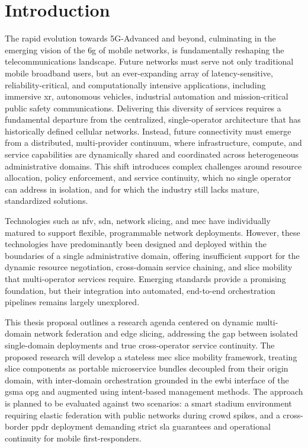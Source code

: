 \chapter{Introduction}
\label{chap:introduction}

\begin{introduction}

\end{introduction}

The rapid evolution towards 5G-Advanced and beyond, culminating in the emerging vision of the \ac{6g} of mobile networks, is fundamentally reshaping the telecommunications landscape. Future networks must serve not only traditional mobile broadband users, but an ever-expanding array of latency-sensitive, reliability-critical, and computationally intensive applications, including immersive \ac{xr}, autonomous vehicles, industrial automation and mission-critical public safety communications. Delivering this diversity of services requires a fundamental departure from the centralized, single-operator architecture that has historically defined cellular networks. Instead, future connectivity must emerge from a distributed, multi-provider continuum, where infrastructure, compute, and service capabilities are dynamically shared and coordinated across heterogeneous administrative domains. This shift introduces complex challenges around resource allocation, policy enforcement, and service continuity, which no single operator can address in isolation, and for which the industry still lacks mature, standardized solutions.

Technologies such as \ac{nfv}, \ac{sdn}, network slicing, and \ac{mec} have individually matured to support flexible, programmable network deployments. However, these technologies have predominantly been designed and deployed within the boundaries of a single administrative domain, offering insufficient support for the dynamic resource negotiation, cross-domain service chaining, and slice mobility that multi-operator services require. Emerging standards provide a promising foundation, but their integration into automated, end-to-end orchestration pipelines remains largely unexplored.

This thesis proposal outlines a research agenda centered on dynamic multi-domain network federation and edge slicing, addressing the gap between isolated single-domain deployments and true cross-operator service continuity. The proposed research will develop a stateless \ac{mec} slice mobility framework, treating slice components as portable microservice bundles decoupled from their origin domain, with inter-domain orchestration grounded in the \ac{ewbi} interface of the \ac{gsma} \ac{opg} and augmented using intent-based management methods. The approach is planned to be evaluated against two scenarios: a smart stadium environment requiring elastic federation with public networks during crowd spikes, and a cross-border \ac{ppdr} deployment demanding strict \ac{sla} guarantees and operational continuity for mobile first-responders.

